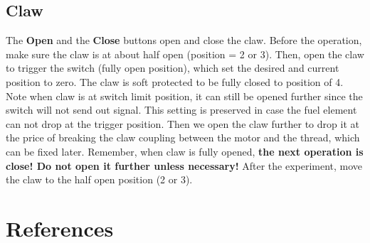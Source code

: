 \documentclass[review,number,sort&compress]{elsarticle}
\begin{document}
\subsection{Claw}
The \textbf{Open} and the \textbf{Close} buttons open and close the claw.
Before the operation, make sure the claw is at about half open (position = 2 or 3).
Then, open the claw to trigger the switch (fully open position), which set the desired and current position to zero.
The claw is soft protected to be fully closed to position of 4.
Note when claw is at switch limit position, it can still be opened further since the switch will not send out signal.
This setting is preserved in case the fuel element can not drop at the trigger position.
Then we open the claw further to drop it at the price of breaking the claw coupling between the motor and the thread, which can be fixed later.
Remember, when claw is fully opened, \textbf{the next operation is close! Do not open it further unless necessary!}
After the experiment, move the claw to the half open position (2 or 3).













\section*{References}
 

\end{document}
